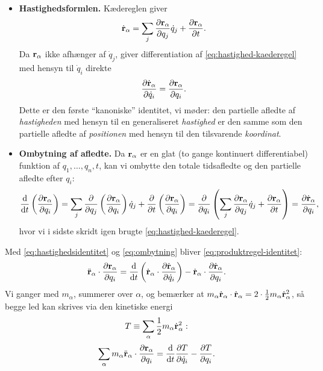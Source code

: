 \begin{itemize}
  \item \textbf{Hastighedsformlen.} Kædereglen giver
        \begin{equation}
          \dot{\vb{r}}_\alpha = \sum_j \pdv{\vb{r}_\alpha}{q_j}\dot q_j + \pdv{\vb{r}_\alpha}{t}.
          \label{eq:hastighed-kaederegel}
        \end{equation}
        Da $\vb{r}_\alpha$ ikke afhænger af $\dot q_j$, giver
        differentiation af \eqref{eq:hastighed-kaederegel} med hensyn
        til $\dot q_i$ direkte
        \begin{equation}
          \pdv{\dot{\vb{r}}_\alpha}{\dot q_i} = \pdv{\vb{r}_\alpha}{q_i}.
          \label{eq:hastighedsidentitet}
        \end{equation}
        Dette er den første ``kanoniske'' identitet, vi møder: den
        partielle afledte af \emph{hastigheden} med hensyn til en
        generaliseret \emph{hastighed} er den samme som den partielle
        afledte af \emph{positionen} med hensyn til den tilsvarende
        \emph{koordinat}.
  \item \textbf{Ombytning af afledte.} Da $\vb{r}_\alpha$ er en
        glat (to gange kontinuert differentiabel) funktion af
        $q_1,\dots,q_n,t$, kan vi ombytte den totale tidsafledte og den
        partielle afledte efter $q_i$:
        \begin{equation}
          \dv{t}\left(\pdv{\vb{r}_\alpha}{q_i}\right)
          = \sum_j \pdv{}{q_j}\left(\pdv{\vb{r}_\alpha}{q_i}\right)\dot q_j
            + \pdv{}{t}\left(\pdv{\vb{r}_\alpha}{q_i}\right)
          = \pdv{}{q_i}\left(\sum_j \pdv{\vb{r}_\alpha}{q_j}\dot q_j + \pdv{\vb{r}_\alpha}{t}\right)
          = \pdv{\dot{\vb{r}}_\alpha}{q_i},
          \label{eq:ombytning}
        \end{equation}
        hvor vi i sidste skridt igen brugte
        \eqref{eq:hastighed-kaederegel}.
\end{itemize}

Med \eqref{eq:hastighedsidentitet} og \eqref{eq:ombytning} bliver
\eqref{eq:produktregel-identitet}:
\begin{equation}
  \ddot{\vb{r}}_\alpha\cdot\pdv{\vb{r}_\alpha}{q_i}
  = \dv{t}\left(\dot{\vb{r}}_\alpha\cdot\pdv{\dot{\vb{r}}_\alpha}{\dot q_i}\right)
    - \dot{\vb{r}}_\alpha\cdot\pdv{\dot{\vb{r}}_\alpha}{q_i}.
\end{equation}
Vi ganger med $m_\alpha$, summerer over $\alpha$, og bemærker at
$m_\alpha\dot{\vb{r}}_\alpha\cdot\dot{\vb{r}}_\alpha = 2\cdot\frac12
m_\alpha \dot{\vb{r}}_\alpha^2$, så begge led kan skrives via den
kinetiske energi
\begin{equation}
  T \equiv \sum_\alpha \frac12 m_\alpha \dot{\vb{r}}_\alpha^2:
\end{equation}
\begin{equation}
  \sum_\alpha m_\alpha\ddot{\vb{r}}_\alpha\cdot\pdv{\vb{r}_\alpha}{q_i}
  = \dv{t}\pdv{T}{\dot q_i} - \pdv{T}{q_i}.
  \label{eq:inertiled-T}
\end{equation}

